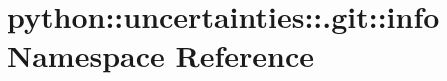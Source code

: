 \hypertarget{namespacepython_1_1uncertainties_1_1_8git_1_1info}{
\section{python::uncertainties::.git::info Namespace Reference}
\label{namespacepython_1_1uncertainties_1_1_8git_1_1info}
}
